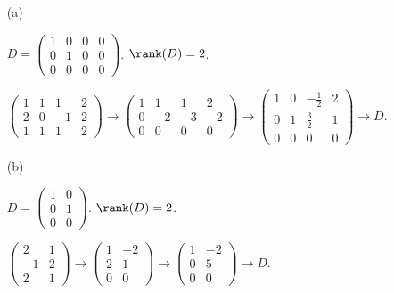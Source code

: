 \begin{Exercise}
	\begin{enumerate}[(a)]
		\item[(a)]
		\begin{answer}
			$D = \begin{pmatrix}
			1 & 0 & 0 & 0 \\
			0 & 1 & 0 & 0 \\
			0 & 0 & 0 & 0
			\end{pmatrix}$. $\rank(D) = 2$.
		\end{answer}
		\begin{solution}
			$\begin{pmatrix}
			1 & 1 & 1 & 2 \\
			2 & 0 & -1 & 2 \\
			1 & 1 & 1 & 2
			\end{pmatrix} \longrightarrow \begin{pmatrix}
			1 & 1 & 1 & 2 \\
			0 & -2 & -3 & -2 \\
			0 & 0 & 0 & 0
			\end{pmatrix} \longrightarrow \begin{pmatrix}
			1 & 0 & -\frac{1}{2} & 2 \\
			0 & 1 & \frac{3}{2} & 1 \\
			0 & 0 & 0 & 0
			\end{pmatrix} \longrightarrow D$.
		\end{solution}
		
		\item[(b)]
		\begin{answer}
			$D = \begin{pmatrix}
			1 & 0 \\
			0 & 1 \\
			0 & 0
			\end{pmatrix}$. $\rank(D) = 2$.
		\end{answer}
		\begin{solution}
			$\begin{pmatrix}
			2 & 1 \\
			-1 & 2 \\
			2 & 1
			\end{pmatrix}  \longrightarrow \begin{pmatrix}
			1 & -2 \\
			2 & 1 \\
			0 & 0
			\end{pmatrix} \longrightarrow \begin{pmatrix}
			1 & -2 \\
			0 & 5 \\
			0 & 0
			\end{pmatrix} \longrightarrow D$.
		\end{solution}
		
	\end{enumerate}
\end{Exercise}